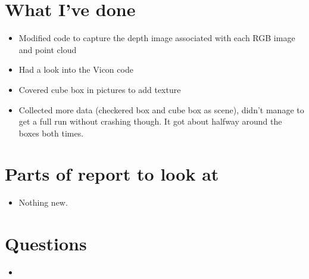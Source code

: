 \documentclass[12pt,a4paper]{article}
\begin{document}
\author{Katrina Ashton}


\pagestyle{fancy}
\fancyhf{}
\rhead{\thepage}

\section{What I've done}
\begin{itemize}
\item{Modified code to capture the depth image associated with each RGB image and point cloud}
\item{Had a look into the Vicon code}
\item{Covered cube box in pictures to add texture}
\item{Collected more data (checkered box and cube box as scene), didn't manage to get a full run without crashing though. It got about halfway around the boxes both times.}
\end{itemize}

\section{Parts of report to look at}
\begin{itemize}
\item{Nothing new.}
\end{itemize}

\section{Questions}
\begin{itemize}
\item
\end{itemize}
\end{document}
